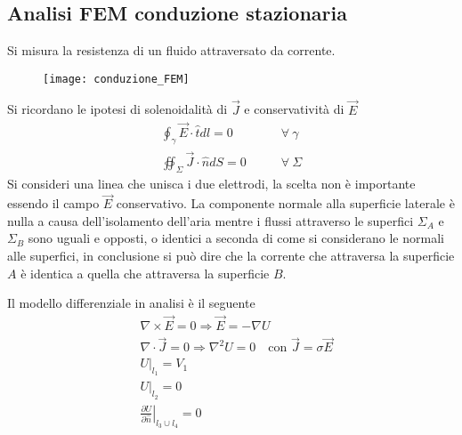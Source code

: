 \subsection{Analisi FEM conduzione stazionaria}
Si misura la resistenza di un fluido attraversato da corrente.
\begin{figure}[H]
\centering
\texttt{[image: conduzione\_FEM]}
\end{figure}
Si ricordano le ipotesi di solenoidalità di $\vec{J}$ e conservatività di $\vec{E}$
\begin{align*}
\oint_\gamma \vec{E}\cdot\hat{t} dl = 0 &\qquad \forall\ \gamma \\
\oiint_\Sigma \vec{J}\cdot\hat{n} dS = 0 &\qquad \forall\ \Sigma
\end{align*}
Si consideri una linea che unisca i due elettrodi, la scelta non è importante
essendo il campo $\vec{E}$ conservativo.
La componente normale alla superficie laterale è nulla a causa dell'isolamento
dell'aria mentre i flussi attraverso le superfici $\Sigma_A$ e $\Sigma_B$ sono 
uguali e opposti, o identici a seconda di come si considerano le normali alle 
superfici, in conclusione si può dire che la corrente che attraversa la superficie $A$
è identica a quella che attraversa la superficie $B$.

Il modello differenziale in analisi è il seguente
\begin{align*}
&\nabla\times\vec{E} = 0 \Rightarrow \vec{E} = -\nabla U\\
&\nabla\cdot\vec{J} = 0 \Rightarrow \nabla^2 U = 0 \quad \text{con }\vec{J} = \sigma\vec{E}\\
&U|_{l_1}  = V_1\\
&U|_{l_2} = 0 \\
&\left.\frac{\partial U}{\partial \hat{n}}\right|_{l_3 \cup l_4} =0
\end{align*}

